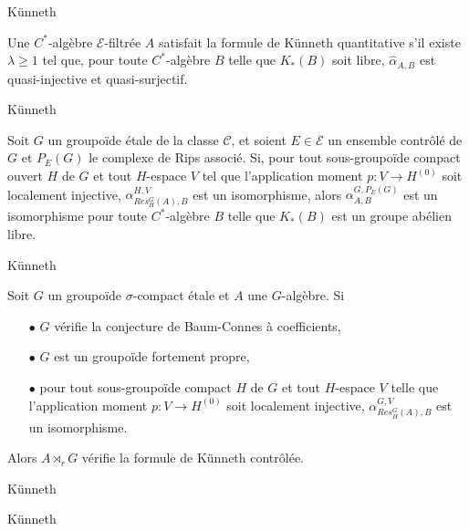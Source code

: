 \begin{frame}{Künneth}
\begin{definitionfr}
Une $C^*$-algèbre $\mathcal E$-filtrée $A$ satisfait la formule de Künneth quantitative s'il existe $\lambda \geq 1$ tel que, pour toute $C^*$-algèbre $B$ telle que $K_*(B)$ soit libre, $\hat\alpha_{A,B}$ est quasi-injective et quasi-surjectif. 
\end{definitionfr}
\end{frame}

\begin{frame}{Künneth}
\begin{thmfr}
Soit $G$ un groupoïde étale de la classe $\mathcal C$, et soient $E\in\mathcal E$ un ensemble contrôlé de $G$ et $P_E(G)$ le complexe de Rips associé. Si, pour tout sous-groupoïde compact ouvert $H$ de $G$ et tout $H$-espace $V$ tel que l'application moment $p : V\rightarrow H^{(0)}$ soit localement injective, $\alpha_{Res_H^G(A),B}^{H,V}$ est un isomorphisme, alors $\alpha_{A,B}^{G,P_E(G)}$ est un isomorphisme pour toute $C^*$-algèbre $B$ telle que $K_*(B)$ est un groupe abélien libre.\\
\end{thmfr}
\end{frame}

\begin{frame}{Künneth}
\begin{thmfr}
Soit $G$ un groupoïde $\sigma$-compact étale et $A$ une $G$-algèbre. Si 
\begin{itemize}
\item[$\bullet$] $G$ vérifie la conjecture de Baum-Connes à coefficients,
\item[$\bullet$] $G$ est un groupoïde fortement propre,
\item[$\bullet$] pour tout sous-groupoïde compact $H$ de $G$ et tout $H$-espace $V$ telle que l'application moment $p : V\rightarrow H^{(0)}$ soit localement injective, $\alpha_{Res_H^G(A),B}^{G,V}$ est un isomorphisme.
\end{itemize} 
Alors $A\rtimes_r G$ vérifie la formule de Künneth contrôlée.
\end{thmfr}
\end{frame}

\begin{frame}{Künneth}
\end{frame}

\begin{frame}{Künneth}
\end{frame}
